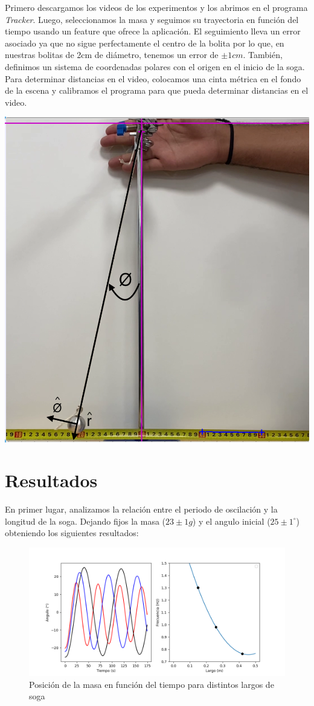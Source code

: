 \documentclass[12pt,a4]{article}
\begin{document}
\begin{minipage}{0.5\textwidth}
    Primero descargamos los videos de los experimentos y los abrimos en el programa \textit{Tracker}. Luego, seleccionamos la masa y seguimos su trayectoria en función del tiempo usando un feature que ofrece la aplicación. El seguimiento lleva un error asociado ya que no sigue perfectamente el centro de la bolita por lo que, en nuestras bolitas de 2cm de diámetro, tenemos un error de $\pm 1cm$. También, definimos un sistema de coordenadas polares con el origen en el inicio de la soga. Para determinar distancias en el video, colocamos una cinta métrica en el fondo de la escena y calibramos el programa para que pueda determinar distancias en el video. 
\end{minipage}
\begin{minipage}{0.5\textwidth}
    \centering
    \includegraphics[width=0.8\linewidth]{tracker.png}
\end{minipage}

\newpage

\section{Resultados}

En primer lugar, analizamos la relación entre el periodo de oscilación y la longitud de la soga. Dejando fijos la masa ($23 \pm 1 g$) y el angulo inicial ($25 \pm 1 ^\circ$) obteniendo los siguientes resultados:

\begin{figure}[H]
    \centering
    \includegraphics[width=0.6\linewidth]{largo.png}
    \caption{Posición de la masa en función del tiempo para distintos largos de soga}
    \label{fig:largo}
\end{figure}
\end{document}
